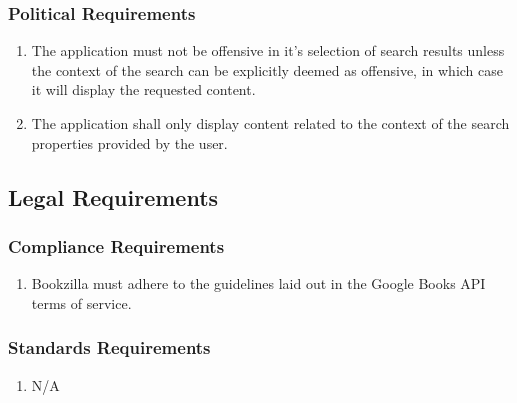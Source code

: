 \documentclass[12pt]{article}
\begin{document}
    \subsubsection{Political Requirements}
    \label{ssub:political_requirements}
    \begin{enumerate}[{CP-P}1. ]
        \item The application must not be offensive in it's selection of search results unless the context of the search can be explicitly deemed as offensive, in which case it will display the requested content. 
        \item The application shall only display content related to the context of the search properties provided by the user. 
    \end{enumerate}
    
    
    \subsection{Legal Requirements}
    \label{sub:legal_requirements}
    
    \subsubsection{Compliance Requirements}
    \label{ssub:compliance_requirements}
    \begin{enumerate}[{LR-C}1. ]
        \item Bookzilla must adhere to the guidelines laid out in the Google Books API terms of service.
        
    \end{enumerate}
    
    \subsubsection{Standards Requirements}
    \label{ssub:standards_requirements}
    \begin{enumerate}[{LR-S}1. ]
        \item N/A
    \end{enumerate}
    
    
    \newpage
    \appendix
\end{document}
